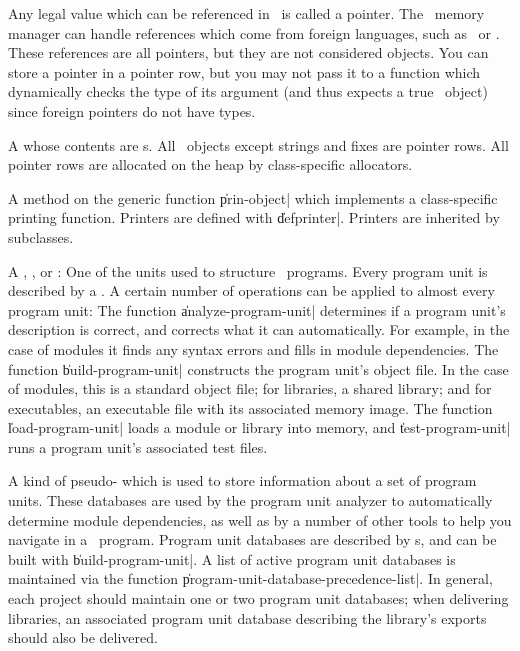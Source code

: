 \begin{description}
	{Any legal value which can be referenced in \Talk\ is called a
	pointer.  The \Talk\ memory manager can handle references which come
	from foreign languages, such as \langc\ or \Cpp.  These
	references are all pointers, but they are not considered
	objects.  You can store a pointer in a pointer row, but you
	may not pass it to a function which dynamically checks the
	type of its argument (and thus expects a true \Talk\ object)
	since foreign pointers do not have types.}

	{A  whose contents are s.  All \Talk\
	objects except strings and fixes are pointer rows.  All
	pointer rows are allocated on the heap by class-specific
	allocators.}

	{A method on the generic function \|prin-object| which
	implements a class-specific printing function.  Printers are
	defined with \|defprinter|.  Printers are inherited by
	subclasses.}

	{A , , or : One of
	the units used to structure \Talk\ programs.  Every program
	unit is described by a .
	A certain number of operations can be applied to almost every
	program unit: The function \|analyze-program-unit| determines
	if a program unit's description is correct, and corrects what
	it can automatically.  For example, in the case of modules it
	finds any syntax errors and fills in module dependencies.
	The function \|build-program-unit| constructs the program
	unit's object file.  In the case of modules, this is a
	standard object file; for libraries, a shared library; and for
	executables, an executable file with its associated memory
	image. The function \|load-program-unit| loads a module or
	library into memory, and \|test-program-unit| runs a program
	unit's associated test files.}

	{A kind of pseudo- which is used to store
	information about a set of program units.  These databases are
	used by the program unit analyzer to automatically determine
	module dependencies, as well as by a number of other tools to
	help you navigate in a \Talk\ program.  Program unit databases
	are described by s, and
	can be built with \|build-program-unit|.  A list of active
	program unit databases is maintained via the function
	\|program-unit-database-precedence-list|.  In general, each
	project should maintain one or two program unit databases;
	when delivering libraries, an associated program unit database
	describing the library's exports should also be delivered.}


\end{description}

